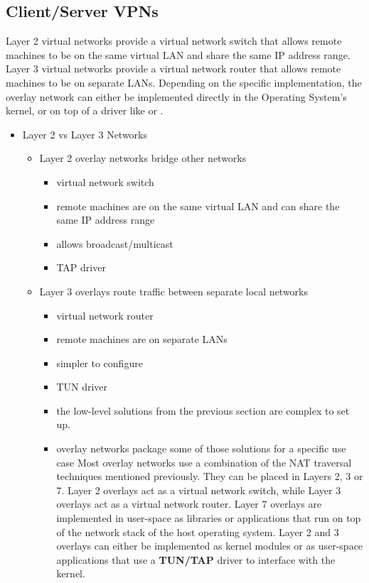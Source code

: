 \subsection{Client/Server VPNs}\label{thesis__022-overlays.md__clientserver-vpns}

Layer 2 virtual networks provide a virtual network switch that allows remote machines to be on the same virtual LAN and share the same IP address range. Layer 3 virtual networks provide a virtual network router that allows remote machines to be on separate LANs. Depending on the specific implementation, the overlay network can either be implemented directly in the Operating System's kernel, or on top of a driver like  or .

\begin{itemize}
\tightlist
\item
  Layer 2 vs Layer 3 Networks

  \begin{itemize}
  \tightlist
  \item
    Layer 2 overlay networks bridge other networks

    \begin{itemize}
    \tightlist
    \item
      virtual network switch
    \item
      remote machines are on the same virtual LAN and can share the same IP address range
    \item
      allows broadcast/multicast
    \item
      TAP driver
    \end{itemize}
  \item
    Layer 3 overlays route traffic between separate local networks

    \begin{itemize}
    \item
      virtual network router
    \item
      remote machines are on separate LANs
    \item
      simpler to configure
    \item
      TUN driver
    \item
      the low-level solutions from the previous section are complex to set up.
    \item
      overlay networks package some of those solutions for a specific use case
      Most overlay networks use a combination of the NAT traversal techniques mentioned previously. They can be placed in Layers 2, 3 or 7. Layer 2 overlays act as a virtual network switch, while Layer 3 overlays act as a virtual network router. Layer 7 overlays are implemented in user-space as libraries or applications that run on top of the network stack of the host operating system. Layer 2 and 3 overlays can either be implemented as kernel modules or as user-space applications that use a \textbf{TUN/TAP}  driver to interface with the kernel.
    \end{itemize}


\end{itemize}
\end{itemize}
